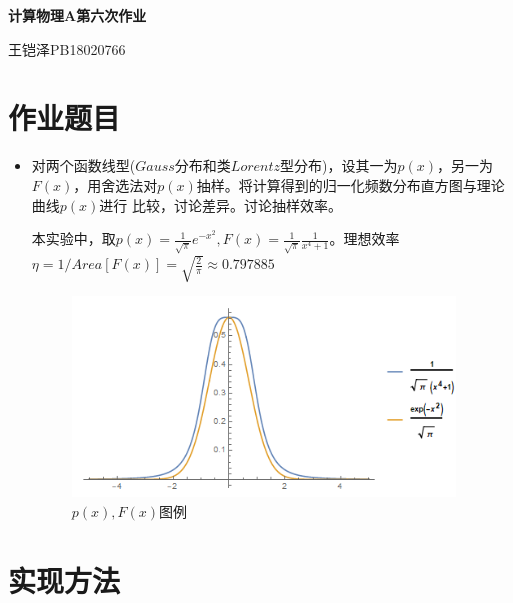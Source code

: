 \documentclass[UTF8]{ctexart}
\begin{document}
	\centering\textbf{\LARGE{计算物理A第六次作业}}
	
	
	王铠泽\qquad PB18020766
	
		
	\section{作业题目}
	
	\begin{itemize}
		\item 对两个函数线型($Gauss$分布和类$Lorentz$型分布)，设其一为$p(x)$，另一为
		$F(x)$，用舍选法对$ p(x) $抽样。将计算得到的归一化频数分布直方图与理论曲线$ p(x) $进行
		比较，讨论差异。讨论抽样效率。
		
		本实验中，取$p(x)=\frac{1}{\sqrt{\pi}}e^{-x^2},F(x)=\frac{1}{\sqrt{\pi}}\frac{1}{x^4+1}$。理想效率$\eta=1/Area[F(x)]=\sqrt{\frac{2}{\pi}}\approx0.797885$
		
			\begin{figure}[H]
			\centering\includegraphics[width=4in]{../figure/func.png}
			\caption{$p(x),F(x)$图例}
			\end{figure}
	\end{itemize}
	
	\section{实现方法}
	
\end{document}

